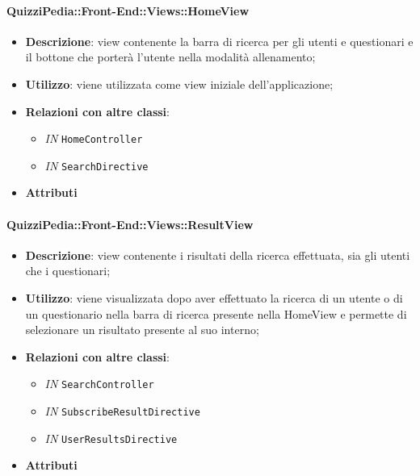 \paragraph{QuizziPedia::Front-End::Views::HomeView}
\begin{itemize}
	\item \textbf{Descrizione}: view contenente la barra di ricerca per gli utenti e questionari e il bottone che porterà l'utente nella modalità allenamento;
	\item \textbf{Utilizzo}: viene utilizzata come view iniziale dell'applicazione;
	\item \textbf{Relazioni con altre classi}:
	\begin{itemize}
		\item \textit{IN} \texttt{HomeController} \\
		\item \textit{IN} \texttt{SearchDirective} \\
	\end{itemize}
	\item \textbf{Attributi}
\end{itemize}
	
\paragraph{QuizziPedia::Front-End::Views::ResultView}
\begin{itemize}
	\item \textbf{Descrizione}: view contenente i risultati della ricerca effettuata, sia gli utenti che i questionari;
	\item \textbf{Utilizzo}: viene visualizzata dopo aver effettuato la ricerca di un utente o di un questionario nella barra di ricerca presente nella HomeView e permette di selezionare un risultato presente al suo interno; 
	\item \textbf{Relazioni con altre classi}:
	\begin{itemize}
		\item \textit{IN} \texttt{SearchController} \\
		\item \textit{IN} \texttt{SubscribeResultDirective} \\
		\item \textit{IN} \texttt{UserResultsDirective} \\ 
	\end{itemize}
	\item \textbf{Attributi}
\end{itemize}

